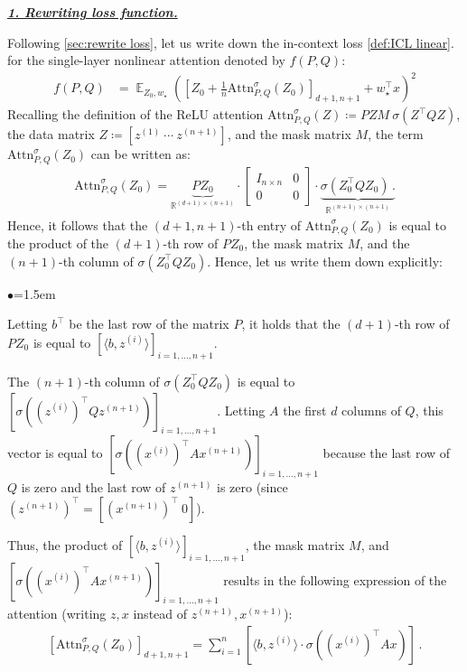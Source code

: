 \documentclass{article}
\DeclareMathOperator{\E}{\mathbb{E}}
\newcommand{\R}{\mathbb{R}}
\newcommand{\atth}{\mathrm{Attn}^\sigma}
\newcommand{\relu}{\sigma}
\renewcommand{\aa}{M}
\newcommand{\bb}{A}
\newcommand{\cc}{b}
\newcommand{\wstar}{w_\star}
\newcommand{\tz}[1]{{z^{(#1)}}}
\newcommand{\tx}[1]{x^{(#1)}}
\newcommand{\emphh}[1]{\textbf{\emph{#1}}}
\newcommand{\inpp}[2]{ \langle #1,#2\rangle}
\begin{document}
\underline{\emphh{1. Rewriting loss function.}}

Following \autoref{sec:rewrite loss}, let us write down the in-context loss  \eqref{def:ICL linear}.  for the single-layer nonlinear attention denoted by $f(P,Q)$:  
\begin{align} 
f\left(P,Q\right)  
&=\E_{Z_0,\wstar} \left( \left[Z_{0} +\frac{1}{n} \atth_{P,Q}(Z_0) \right]_{d+1,n+1} + \wstar^\top x\right)^2
\end{align} 
Recalling the definition of the ReLU attention $\atth_{P,Q}(Z) \coloneqq  P ZM \  \relu (
Z^\top Q Z)$, the data matrix $Z \coloneqq [\tz{1} \ \cdots \ \tz{n+1}]$, and the mask matrix $\aa$, the term $ \atth_{P,Q}(Z_0)$ can be written as:
\begin{align}
\atth_{P,Q}(Z_0) = \underbrace{PZ_0}_{\R^{(d+1)\times (n+1)} } \cdot  \begin{bmatrix} I_{n\times n} & 0 \\0 & 0 \end{bmatrix}  \cdot   \underbrace{\relu\left(Z_0^\top Q Z_0 \right)\,.}_{\R^{(n+1)\times (n+1)}}
\end{align}
Hence, it follows that the $(d+1, n+1)$-th entry of $\atth_{P,Q}(Z_0)$ is equal to the product of the $(d+1)$-th row of $PZ_0$, the mask matrix $\aa$, and the $(n+1)$-th column of $\relu\left(Z_0^\top Q Z_0 \right)$. Hence, let us write them down explicitly:
\begin{list}{$\bullet$}{\leftmargin=1.5em}
\setlength{\itemsep}{1pt}
\item Letting $\cc^\top$ be the last row of the matrix $P$, it holds that the $(d+1)$-th row of $PZ_0$ is equal to $[\inpp{\cc}{\tz{i}}]_{i=1,\dots,n+1}$.
\item The $(n+1)$-th column of $\relu\left(Z_0^\top Q Z_0 \right)$ is equal to $\left[\relu\left((\tz{i})^\top Q \tz{n+1} \right)  \right]_{i=1,\dots, n+1}$. Letting  $\bb$ the first $d$ columns of $Q$,  this vector is equal to $\left[\relu\left((\tx{i})^\top \bb \tx{n+1} \right) \right]_{i=1,\dots, n+1}$ because the last row of $Q$ is zero and the last row of $\tz{n+1}$ is zero (since $(\tz{n+1})^\top = [(\tx{n+1})^\top \ 0]$). 
\end{list}
Thus, the product of   $[\inpp{\cc}{\tz{i}}]_{i=1,\dots,n+1}$, the mask matrix $\aa$, and $\left[\relu\left((\tx{i})^\top \bb \tx{n+1} \right) \right]_{i=1,\dots, n+1}$ results in the following expression of the attention (writing $z,x$ instead of  $\tz{n+1},\tx{n+1}$):
\begin{align}
    \left[ \atth_{P,Q}(Z_0) \right]_{d+1,n+1}    =  \sum_{i=1}^n \left[ \inpp{\cc}{\tz{i}} \cdot \relu((\tx{i})^\top \bb x ) \right] \,.
\end{align} 
\end{document}
